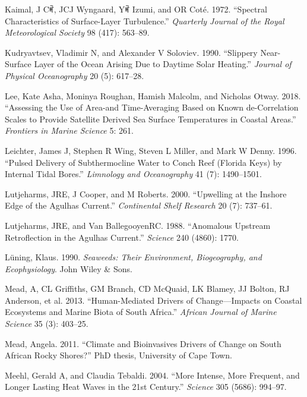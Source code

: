 \documentclass[10pt,a4paper,]{article}
\begin{document}
\leavevmode\hypertarget{ref-Kaimal1972}{}%
Kaimal, J Cꎬ, JCJ Wyngaard, Yꎬ Izumi, and OR Coté. 1972. ``Spectral
Characteristics of Surface-Layer Turbulence.'' \emph{Quarterly Journal
of the Royal Meteorological Society} 98 (417): 563--89.

\leavevmode\hypertarget{ref-Kudryavtsev1990}{}%
Kudryavtsev, Vladimir N, and Alexander V Soloviev. 1990. ``Slippery
Near-Surface Layer of the Ocean Arising Due to Daytime Solar Heating.''
\emph{Journal of Physical Oceanography} 20 (5): 617--28.

\leavevmode\hypertarget{ref-Lee2018}{}%
Lee, Kate Asha, Moninya Roughan, Hamish Malcolm, and Nicholas Otway.
2018. ``Assessing the Use of Area-and Time-Averaging Based on Known
de-Correlation Scales to Provide Satellite Derived Sea Surface
Temperatures in Coastal Areas.'' \emph{Frontiers in Marine Science} 5:
261.

\leavevmode\hypertarget{ref-Leichter1996}{}%
Leichter, James J, Stephen R Wing, Steven L Miller, and Mark W Denny.
1996. ``Pulsed Delivery of Subthermocline Water to Conch Reef (Florida
Keys) by Internal Tidal Bores.'' \emph{Limnology and Oceanography} 41
(7): 1490--1501.

\leavevmode\hypertarget{ref-Lutjeharms2000}{}%
Lutjeharms, JRE, J Cooper, and M Roberts. 2000. ``Upwelling at the
Inshore Edge of the Agulhas Current.'' \emph{Continental Shelf Research}
20 (7): 737--61.

\leavevmode\hypertarget{ref-Lutjeharms1988}{}%
Lutjeharms, JRE, and Van BallegooyenRC. 1988. ``Anomalous Upstream
Retroflection in the Agulhas Current.'' \emph{Science} 240 (4860): 1770.

\leavevmode\hypertarget{ref-Luning1990}{}%
Lüning, Klaus. 1990. \emph{Seaweeds: Their Environment, Biogeography,
and Ecophysiology}. John Wiley \& Sons.

\leavevmode\hypertarget{ref-Mead2013}{}%
Mead, A, CL Griffiths, GM Branch, CD McQuaid, LK Blamey, JJ Bolton, RJ
Anderson, et al. 2013. ``Human-Mediated Drivers of Change---Impacts on
Coastal Ecosystems and Marine Biota of South Africa.'' \emph{African
Journal of Marine Science} 35 (3): 403--25.

\leavevmode\hypertarget{ref-Mead2011}{}%
Mead, Angela. 2011. ``Climate and Bioinvasives Drivers of Change on
South African Rocky Shores?'' PhD thesis, University of Cape Town.

\leavevmode\hypertarget{ref-Meehl2004}{}%
Meehl, Gerald A, and Claudia Tebaldi. 2004. ``More Intense, More
Frequent, and Longer Lasting Heat Waves in the 21st Century.''
\emph{Science} 305 (5686): 994--97.
\end{document}
